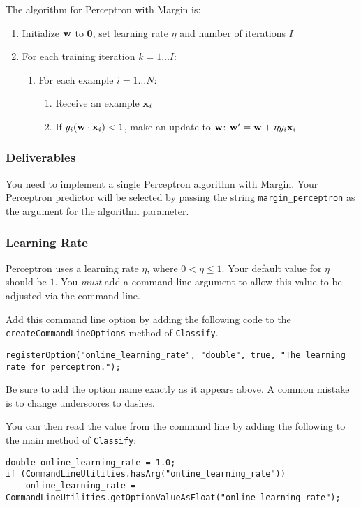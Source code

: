 \documentclass[11pt]{article}
\newcommand{\vw}{{\bf w}}
\newcommand{\vxi}{{\bf x}_i}
\newcommand{\yi}{y_i}
\newcommand{\code}[1]{{\footnotesize \tt #1}}
\begin{document}
The algorithm for Perceptron with Margin is:
\begin{enumerate}
\item Initialize $\vw$ to {\bf 0}, set learning rate $\eta$ and number of iterations $I$
\item For each training iteration $k = 1 \ldots I$:
\begin{enumerate}
\item For each example $i=1\ldots N$:
\begin{enumerate}
\item Receive an example $\vxi$
\item If  $\yi (\vw \cdot \vxi) < 1$, make an update to $\vw$: $\vw' = \vw + \eta \yi \vxi$
\end{enumerate}
\end{enumerate}
\end{enumerate}

\subsubsection{Deliverables}
You need to implement a single Perceptron algorithm with Margin. Your Perceptron predictor will be selected by passing the string \code{margin\_perceptron} as the argument for the algorithm parameter.

\subsubsection{Learning Rate}
Perceptron uses a learning rate $\eta$, where  $0 < \eta \leq 1$.  Your default value for $\eta$ should be $1$. You \emph{must} add a command line argument to allow this value to be adjusted via the command line.

Add this command line option by adding the following code to the \code{createCommandLineOptions} method of \code{Classify}.
\begin{footnotesize}
\begin{verbatim}
registerOption("online_learning_rate", "double", true, "The learning rate for perceptron.");
\end{verbatim}
\end{footnotesize}

Be sure to add the option name exactly as it appears above. A common mistake is to change underscores to dashes.

You can then read the value from the command line by adding the following to the main method of \code{Classify}:
\begin{footnotesize}
\begin{verbatim}
double online_learning_rate = 1.0;
if (CommandLineUtilities.hasArg("online_learning_rate"))
    online_learning_rate = CommandLineUtilities.getOptionValueAsFloat("online_learning_rate");
\end{verbatim}
\end{footnotesize}
\end{document}
